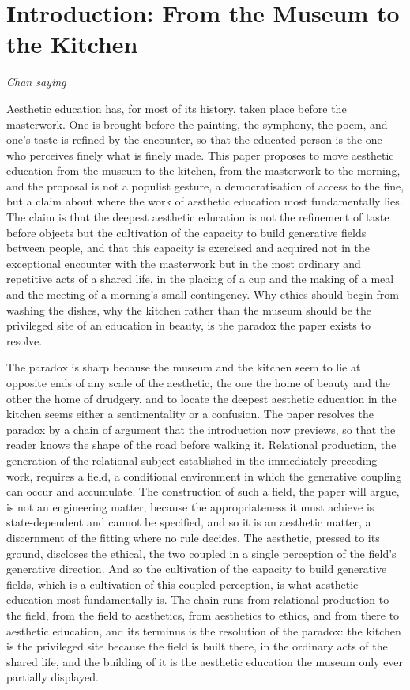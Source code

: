 \section{Introduction: From the Museum to the Kitchen}
\label{p22:sec:introduction}

\epigraph{}{\textit{Chan saying}}

\noindent
Aesthetic education has, for most of its history, taken place before the masterwork. One is brought before the painting, the symphony, the poem, and one's taste is refined by the encounter, so that the educated person is the one who perceives finely what is finely made. This paper proposes to move aesthetic education from the museum to the kitchen, from the masterwork to the morning, and the proposal is not a populist gesture, a democratisation of access to the fine, but a claim about where the work of aesthetic education most fundamentally lies. The claim is that the deepest aesthetic education is not the refinement of taste before objects but the cultivation of the capacity to build generative fields between people, and that this capacity is exercised and acquired not in the exceptional encounter with the masterwork but in the most ordinary and repetitive acts of a shared life, in the placing of a cup and the making of a meal and the meeting of a morning's small contingency. Why ethics should begin from washing the dishes, why the kitchen rather than the museum should be the privileged site of an education in beauty, is the paradox the paper exists to resolve.

\medskip\noindent

The paradox is sharp because the museum and the kitchen seem to lie at opposite ends of any scale of the aesthetic, the one the home of beauty and the other the home of drudgery, and to locate the deepest aesthetic education in the kitchen seems either a sentimentality or a confusion. The paper resolves the paradox by a chain of argument that the introduction now previews, so that the reader knows the shape of the road before walking it. Relational production, the generation of the relational subject established in the immediately preceding work, requires a field, a conditional environment in which the generative coupling can occur and accumulate. The construction of such a field, the paper will argue, is not an engineering matter, because the appropriateness it must achieve is state-dependent and cannot be specified, and so it is an aesthetic matter, a discernment of the fitting where no rule decides. The aesthetic, pressed to its ground, discloses the ethical, the two coupled in a single perception of the field's generative direction. And so the cultivation of the capacity to build generative fields, which is a cultivation of this coupled perception, is what aesthetic education most fundamentally is. The chain runs from relational production to the field, from the field to aesthetics, from aesthetics to ethics, and from there to aesthetic education, and its terminus is the resolution of the paradox: the kitchen is the privileged site because the field is built there, in the ordinary acts of the shared life, and the building of it is the aesthetic education the museum only ever partially displayed.

